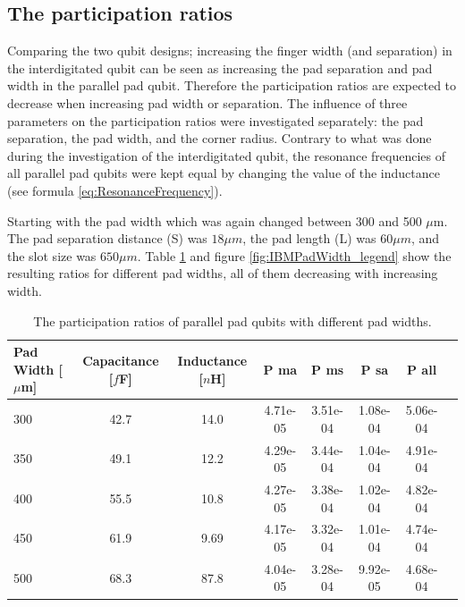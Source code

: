 \clearpage
\subsection{The participation ratios}
 Comparing the two qubit designs; increasing the finger width (and separation) in the interdigitated qubit can be seen as increasing the pad separation and pad width in the parallel pad qubit. Therefore the participation ratios are expected to decrease when increasing pad width or separation. The influence of three parameters on the participation ratios were investigated separately: the pad separation, the pad width, and the corner radius. Contrary to what was done during the investigation of the interdigitated qubit, the resonance frequencies of all parallel pad qubits were kept equal by changing the value of the inductance (see formula \eqref{eq:ResonanceFrequency}).
 
 Starting with the pad width which was again changed between 300 and 500 \(\mu\)m. The pad separation distance (S) was \(18 \mu m\), the pad length (L) was \(60 \mu m\), and the slot size was \(650 \mu m\). Table \ref{table:ratio_IBMPadWidth} and figure \ref{fig:IBMPadWidth_legend} show the resulting ratios for different pad widths, all of them decreasing with increasing width.
 
 \begin{table}
 	\begin{center}
 		\begin{tabular}{ | l || c | c || c | c | c | c | c |}
 			\hline
 			Pad Width [\(\mu\)m] & Capacitance [\(f\)F] & Inductance [\(n\)H] & P ma & P ms & P sa & P all \\ \hline
 			300 & 42.7 & 14.0 & 4.71e-05 & 3.51e-04 & 1.08e-04 & 5.06e-04 \\
 			350 & 49.1 & 12.2 & 4.29e-05 & 3.44e-04 & 1.04e-04 & 4.91e-04 \\
 			400 & 55.5 & 10.8 & 4.27e-05 & 3.38e-04 & 1.02e-04 & 4.82e-04 \\
 			450 & 61.9 & 9.69 & 4.17e-05 & 3.32e-04 & 1.01e-04 & 4.74e-04 \\
 			500 & 68.3 & 87.8 & 4.04e-05 & 3.28e-04 & 9.92e-05 & 4.68e-04\\
 			\hline
 		\end{tabular}
 	\end{center}
 	\caption{The participation ratios of parallel pad qubits with different pad widths.}
 	\label{table:ratio_IBMPadWidth}
 \end{table}
 
